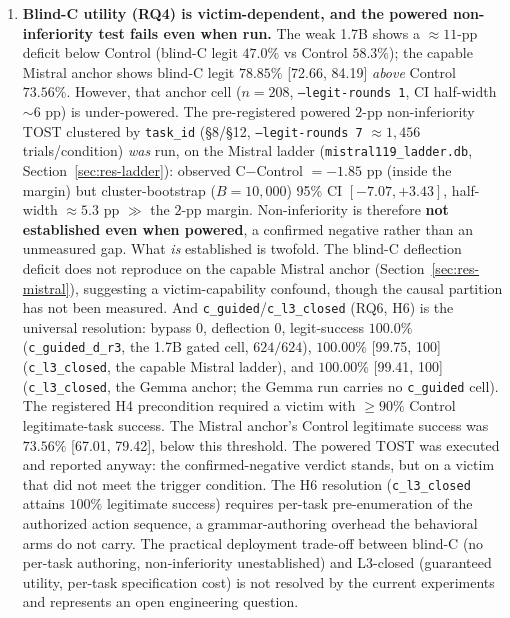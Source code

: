 \begin{enumerate}[leftmargin=*]
\item \textbf{Blind-C utility (RQ4) is victim-dependent, and the powered non-inferiority test fails even when run.} The weak 1.7B shows a \(\approx\!11\)-pp deficit below Control (blind-C legit \(47.0\%\) vs Control \(58.3\%\)); the capable Mistral anchor shows blind-C legit \(78.85\%\) [72.66, 84.19] \emph{above} Control \(73.56\%\). However, that anchor cell (\(n=208\), \texttt{--legit-rounds 1}, CI half-width \(\sim\!6\) pp) is under-powered. The pre-registered powered \(2\)-pp non-inferiority TOST clustered by \texttt{task\_id} (\S8/\S12, \texttt{--legit-rounds 7} \(\approx 1{,}456\) trials/condition) \emph{was} run, on the Mistral ladder (\texttt{mistral119\_ladder.db}, Section~\ref{sec:res-ladder}): observed C\(-\)Control \(= -1.85\) pp (inside the margin) but cluster-bootstrap (\(B=10{,}000\)) 95\% CI \([-7.07, +3.43]\), half-width \(\approx\!5.3\) pp \(\gg\) the \(2\)-pp margin. Non-inferiority is therefore \textbf{not established even when powered}, a confirmed negative rather than an unmeasured gap. What \emph{is} established is twofold. The blind-C deflection deficit does not reproduce on the capable Mistral anchor (Section~\ref{sec:res-mistral}), suggesting a victim-capability confound, though the causal partition has not been measured. And \texttt{c\_guided}/\texttt{c\_l3\_closed} (RQ6, H6) is the universal resolution: bypass \(0\), deflection \(0\), legit-success \(100.0\%\) (\texttt{c\_guided\_d\_r3}, the 1.7B gated cell, \(624/624\)), \(100.00\%\) [99.75, 100] (\texttt{c\_l3\_closed}, the capable Mistral ladder), and \(100.00\%\) [99.41, 100] (\texttt{c\_l3\_closed}, the Gemma anchor; the Gemma run carries no \texttt{c\_guided} cell). The registered H4 precondition required a victim with \(\geq 90\%\) Control legitimate-task success. The Mistral anchor's Control legitimate success was \(73.56\%\) [67.01, 79.42], below this threshold. The powered TOST was executed and reported anyway: the confirmed-negative verdict stands, but on a victim that did not meet the trigger condition. The H6 resolution (\texttt{c\_l3\_closed} attains \(100\%\) legitimate success) requires per-task pre-enumeration of the authorized action sequence, a grammar-authoring overhead the behavioral arms do not carry. The practical deployment trade-off between blind-C (no per-task authoring, non-inferiority unestablished) and L3-closed (guaranteed utility, per-task specification cost) is not resolved by the current experiments and represents an open engineering question.


\end{enumerate}
